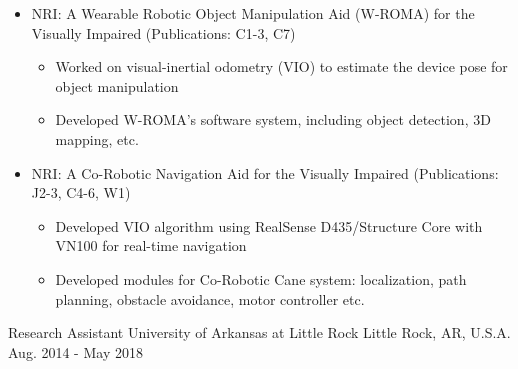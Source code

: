 \begin{cventries}
{%
      	  \vspace{-4.0mm}
      	\begin{justify}
      		\begin{itemize}[leftmargin=2ex, nosep, noitemsep]
      			\setlength{\parskip}{0pt}
      			\renewcommand{\labelitemi}{\bullet}
      			\item {NRI: A Wearable Robotic Object Manipulation Aid (W-ROMA) for the Visually Impaired (Publications: C1-3, C7)}
      			\begin{itemize}[leftmargin=3ex]
      				\scriptsize
      				\item {Worked on visual-inertial odometry (VIO) to estimate the device pose for object manipulation}
      				\item {Developed W-ROMA's software system, including object detection, 3D mapping, etc. }
      			\end{itemize}
      			\item {NRI: A Co-Robotic Navigation Aid for the Visually Impaired (Publications: J2-3, C4-6, W1)}
      			\begin{itemize}[leftmargin=3ex]
      				\scriptsize
      				\item {Developed VIO algorithm using RealSense D435/Structure Core with VN100 for real-time navigation}
      				\item {Developed modules for Co-Robotic Cane system: localization, path planning, obstacle avoidance, motor controller etc.}
      			\end{itemize}
      		\end{itemize}
      	\end{justify}
      	\vspace{-4.0mm}  
     }
  \cventry
    {Research Assistant} %
    {University of Arkansas at Little Rock} %
    {Little Rock, AR, U.S.A.} %
    {Aug. 2014 - May 2018} %
    {
    	  \vspace{-4.0mm}
 \begin{justify}
 	\begin{itemize}[leftmargin=2ex, nosep, noitemsep]

\end{itemize}
\end{justify}}
\end{cventries}
